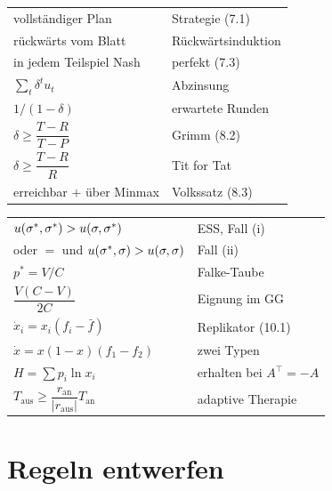 \begin{merksatz}
\begin{center}
{\small
\renewcommand{\arraystretch}{1.62}
\begin{tabular}{@{}P{4.4cm}P{4.2cm}@{}}
\toprule
vollständiger Plan & Strategie (7.1)\\
rückwärts vom Blatt & Rückwärtsinduktion\\
in jedem Teilspiel Nash & perfekt (7.3)\\
$\sum_t \delta^{t} u_t$ & Abzinsung\\
$1/(1-\delta)$ & erwartete Runden\\
$\delta \ge \dfrac{T-R}{T-P}$ & Grimm (8.2)\\
$\delta \ge \dfrac{T-R}{R}$ & Tit for Tat\\
erreichbar $+$ über Minmax & Volkssatz (8.3)\\
\bottomrule
\end{tabular}}
\end{center}
\end{merksatz}

\begin{merksatz}
\begin{center}
{\small
\renewcommand{\arraystretch}{1.62}
\begin{tabular}{@{}P{4.4cm}P{4.2cm}@{}}
\toprule
$u(\sigma^{*},\sigma^{*}) > u(\sigma,\sigma^{*})$ & ESS, Fall (i)\\
oder $=$ und $u(\sigma^{*},\sigma)>u(\sigma,\sigma)$ & Fall (ii)\\
$p^{*} = V/C$ & Falke-Taube\\
$\dfrac{V(C-V)}{2C}$ & Eignung im GG\\
$\dot x_i = x_i(f_i-\bar f)$ & Replikator (10.1)\\
$\dot x = x(1-x)(f_1-f_2)$ & zwei Typen\\
$H = \sum p_i \ln x_i$ & erhalten bei $A^{\!\top}=-A$\\
$T_{\text{aus}} \ge \dfrac{r_{\text{an}}}{|r_{\text{aus}}|}T_{\text{an}}$ & adaptive Therapie\\
\bottomrule
\end{tabular}}
\end{center}
\end{merksatz}

\section{Regeln entwerfen}

